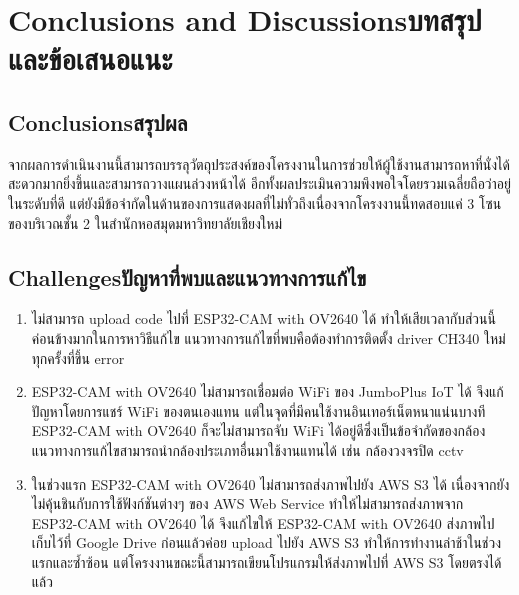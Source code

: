 \chapter{\ifenglish Conclusions and Discussions\else บทสรุปและข้อเสนอแนะ\fi}

\section{\ifenglish Conclusions\else สรุปผล\fi}

จากผลการดำเนินงานนี้สามารถบรรลุวัตถุประสงค์ของโครงงานในการช่วยให้ผู้ใช้งานสามารถหาที่นั่งได้สะดวกมากยิ่งขึ้นและสามารถวางแผนล่วงหน้าได้ อีกทั้งผลประเมินความพึงพอใจโดยรวมเฉลี่ยถือว่าอยู่ในระดับที่ดี
แต่ยังมีข้อจำกัดในด้านของการแสดงผลที่ไม่ทั่วถึงเนื่องจากโครงงานนี้ทดสอบแค่ 3 โซนของบริเวณชั้น 2 ในสำนักหอสมุดมหาวิทยาลัยเชียงใหม่

\section{\ifenglish Challenges\else ปัญหาที่พบและแนวทางการแก้ไข\fi}

\begin{enumerate}
    \item ไม่สามารถ upload code ไปที่ ESP32-CAM with OV2640 ได้ ทำให้เสียเวลากับส่วนนี้ค่อนข้างมากในการหาวิธีแก้ไข แนวทางการแก้ไขที่พบคือต้องทำการติดตั้ง driver CH340 ใหม่ทุกครั้งที่ขึ้น error
    \item ESP32-CAM with OV2640 ไม่สามารถเชื่อมต่อ WiFi ของ JumboPlus IoT ได้ จึงแก้ปัญหาโดยการแชร์ WiFi ของตนเองแทน แต่ในจุดที่มีคนใช้งานอินเทอร์เน็ตหนาแน่นบางที ESP32-CAM with OV2640 ก็จะไม่สามารถจับ WiFi ได้อยู่ดีซึ่งเป็นข้อจำกัดของกล้อง แนวทางการแก้ไขสามารถนำกล้องประเภทอื่นมาใช้งานแทนได้ เช่น กล้องวงจรปิด cctv
    \item ในช่วงแรก ESP32-CAM with OV2640 ไม่สามารถส่งภาพไปยัง AWS S3 ได้ เนื่องจากยังไม่คุ้นชินกับการใช้ฟังก์ชันต่างๆ ของ AWS Web Service 
    ทำให้ไม่สามารถส่งภาพจาก ESP32-CAM with OV2640 ได้ จึงแก้ไขให้ ESP32-CAM with OV2640 ส่งภาพไปเก็บไว้ที่ Google Drive ก่อนแล้วค่อย upload ไปยัง AWS S3 ทำให้การทำงานล่าช้าในช่วงแรกและซ้ำซ้อน แต่โครงงานขณะนี้สามารถเขียนโปรแกรมให้ส่งภาพไปที่ AWS S3 โดยตรงได้แล้ว
\end{enumerate}

